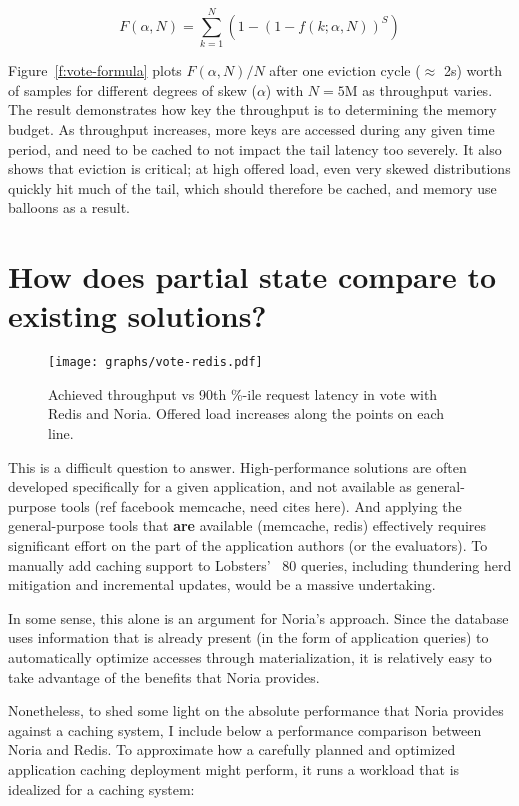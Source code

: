 \begin{displaymath}
  F(\alpha,N)={\sum \limits _{k=1}^{N} \left(1 - \left(1 - f(k; \alpha, N)\right)^{S}\right)}
\end{displaymath}

Figure~\ref{f:vote-formula} plots $F(\alpha, N)/N$ after one eviction cycle
($\approx$ 2s) worth of samples for different degrees of skew ($\alpha$) with
$N=5\text{M}$ as throughput varies. The result demonstrates how key the
throughput is to determining the memory budget. As throughput increases, more
keys are accessed during any given time period, and need to be cached to not
impact the tail latency too severely. It also shows that eviction is critical;
at high offered load, even very skewed distributions quickly hit much of the
tail, which should therefore be cached, and memory use balloons as a result.

\section{How does partial state compare to existing solutions?}
\label{s:eval:existing}

\begin{figure}[h]
  \centering
  \texttt{[image: graphs/vote-redis.pdf]}
  \caption{Achieved throughput vs 90th \%-ile request latency in vote with Redis
  and Noria. Offered load increases along the points on each line.}
  \label{f:vote-redis}
\end{figure}

This is a difficult question to answer. High-performance solutions are
often developed specifically for a given application, and not available
as general-purpose tools (ref facebook memcache, need cites here).
And applying the general-purpose tools that \textbf{are} available (memcache,
redis) effectively requires significant effort on the part of the application
authors (or the evaluators). To manually add caching support to Lobsters' ~80
queries, including thundering herd mitigation and incremental updates, would be
a massive undertaking.

In some sense, this alone is an argument for Noria's approach. Since the
database uses information that is already present (in the form of application
queries) to automatically optimize accesses through materialization, it is
relatively easy to take advantage of the benefits that Noria provides.

Nonetheless, to shed some light on the absolute performance that Noria provides
against a caching system, I include below a performance comparison between Noria
and Redis. To approximate how a carefully planned and optimized application
caching deployment might perform, it runs a workload that is idealized for a
caching system:

